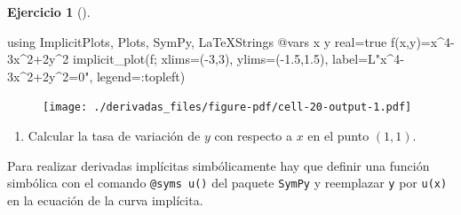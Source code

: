 \documentclass[
  a4paper,
]{scrreport}
\newenvironment{Shaded}{\begin{snugshade}}{\end{snugshade}}
\newcommand{\BuiltInTok}[1]{\textcolor[rgb]{0.00,0.23,0.31}{#1}}
\newcommand{\ConstantTok}[1]{\textcolor[rgb]{0.56,0.35,0.01}{#1}}
\newcommand{\FloatTok}[1]{\textcolor[rgb]{0.68,0.00,0.00}{#1}}
\newcommand{\FunctionTok}[1]{\textcolor[rgb]{0.28,0.35,0.67}{#1}}
\newcommand{\ImportTok}[1]{\textcolor[rgb]{0.00,0.46,0.62}{#1}}
\newcommand{\NormalTok}[1]{\textcolor[rgb]{0.00,0.23,0.31}{#1}}
\newcommand{\OperatorTok}[1]{\textcolor[rgb]{0.37,0.37,0.37}{#1}}
\newcommand{\PreprocessorTok}[1]{\textcolor[rgb]{0.68,0.00,0.00}{#1}}
\newcommand{\StringTok}[1]{\textcolor[rgb]{0.13,0.47,0.30}{#1}}
\providecommand{\tightlist}{%
  \setlength{\itemsep}{0pt}\setlength{\parskip}{0pt}}\usepackage{longtable,booktabs,array}
\theoremstyle{definition}
\newtheorem{exercise}{Ejercicio}[chapter]
\theoremstyle{remark}
\begin{document}
\begin{exercise}[]
\begin{tcolorbox}
\begin{Shaded}
\begin{Highlighting}[]
\ImportTok{using} \BuiltInTok{ImplicitPlots}\NormalTok{, }\BuiltInTok{Plots}\NormalTok{, }\BuiltInTok{SymPy}\NormalTok{, }\BuiltInTok{LaTeXStrings}
\PreprocessorTok{@vars}\NormalTok{ x y real}\OperatorTok{=}\ConstantTok{true}
\FunctionTok{f}\NormalTok{(x,y)}\OperatorTok{=}\NormalTok{x}\OperatorTok{\^{}}\FloatTok{4}\OperatorTok{{-}}\FloatTok{3}\NormalTok{x}\OperatorTok{\^{}}\FloatTok{2}\OperatorTok{+}\FloatTok{2}\NormalTok{y}\OperatorTok{\^{}}\FloatTok{2}
\FunctionTok{implicit\_plot}\NormalTok{(f; xlims}\OperatorTok{=}\NormalTok{(}\OperatorTok{{-}}\FloatTok{3}\NormalTok{,}\FloatTok{3}\NormalTok{), ylims}\OperatorTok{=}\NormalTok{(}\OperatorTok{{-}}\FloatTok{1.5}\NormalTok{,}\FloatTok{1.5}\NormalTok{), label}\OperatorTok{=}\NormalTok{L}\StringTok{"x\^{}4{-}3x\^{}2+2y\^{}2=0"}\NormalTok{, legend}\OperatorTok{=:}\NormalTok{topleft)}
\end{Highlighting}
\end{Shaded}

\begin{figure}[H]

{\centering \texttt{[image: ./derivadas\_files/figure-pdf/cell-20-output-1.pdf]}

}

\end{figure}

\end{tcolorbox}

\begin{enumerate}
\def\labelenumi{\alph{enumi}.}
\setcounter{enumi}{1}
\tightlist
\item
  Calcular la tasa de variación de \(y\) con respecto a \(x\) en el
  punto \((1,1)\).
\end{enumerate}

\begin{tcolorbox}[enhanced jigsaw, toprule=.15mm, arc=.35mm, bottomrule=.15mm, titlerule=0mm, bottomtitle=1mm, opacitybacktitle=0.6, colbacktitle=quarto-callout-note-color!10!white, colframe=quarto-callout-note-color-frame, opacityback=0, title=\textcolor{quarto-callout-note-color}{\faInfo}\hspace{0.5em}{Ayuda}, breakable, colback=white, toptitle=1mm, leftrule=.75mm, coltitle=black, rightrule=.15mm, left=2mm]

Para realizar derivadas implícitas simbólicamente hay que definir una
función simbólica con el comando \texttt{@syms\ u()} del paquete
\texttt{SymPy} y reemplazar \texttt{y} por \texttt{u(x)} en la ecuación
de la curva implícita.


\end{tcolorbox}
\end{exercise}
\end{document}
